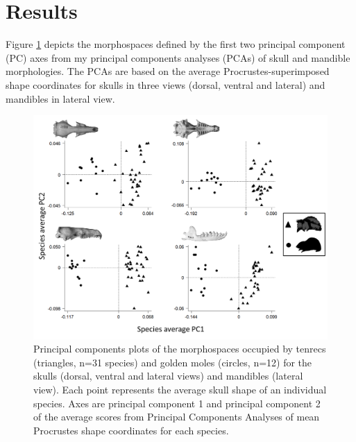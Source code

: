	
	

\section{Results}
\label{sect:results}

	Figure \ref{fig:FourPCA} depicts the morphospaces defined by the first two principal component (PC) axes from my principal components analyses (PCAs) of skull and mandible morphologies. The PCAs are based on the average Procrustes-superimposed shape coordinates for skulls in three views (dorsal, ventral and lateral) and mandibles in lateral view.

	
	\begin{figure}[!htbp]
	\centering
	\includegraphics[width=1\linewidth]{Disparity/writing/figures/FourPCA_shapes.png}
	\caption[Morphospace (principal components) plot of morphological diversity in lateral views of tenrec and golden mole skulls.]
		{Principal components plots of the morphospaces occupied by tenrecs (triangles, n=31 species) and golden moles (circles, n=12) for the skulls (dorsal, ventral and lateral views) and mandibles (lateral view). Each point represents the average skull shape of an individual species. Axes are principal component 1 and principal component 2 of the average scores from Principal Components Analyses of mean Procrustes shape coordinates for each species.}
	\label{fig:FourPCA}
	\end{figure}


